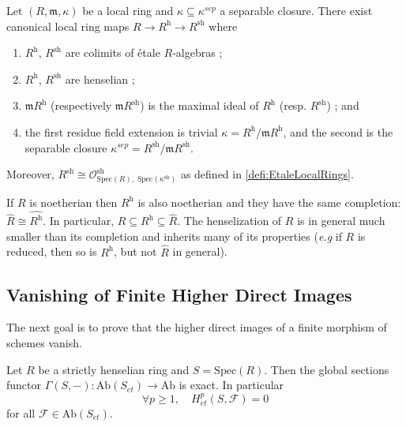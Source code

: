 \begin{theorem}
Let $(R, \mathfrak m, \kappa)$ be a local ring and $\kappa\subseteq\kappa^{sep}$ a separable closure. There exist canonical local ring maps $ R\to R^\text{h} \to R^\text{sh}$ where
\begin{enumerate}
\item $R^\text{h}$, $R^\text{sh}$ are colimits of \'etale $R$-algebras ;
\item $R^\text{h}$, $R^\text{sh}$ are henselian ;
\item $\mathfrak m R^\text{h}$ (respectively $\mathfrak m R^\text{sh}$) is the maximal ideal of $R^\text{h}$ (resp. $R^\text{sh}$) ; and 
\item the first residue field extension is trivial $\kappa=R^\text{h}/\mathfrak m R^\text{h}$, and the second is the separable closure $\kappa^{sep} = R^\text{sh}/\mathfrak m R^\text{sh}$. 
\end{enumerate} 
Moreover, $R^\text{sh}\cong \mathcal{O}^\text{sh}_{\text{Spec}(R), \; \text{Spec}(\kappa^\text{sh})}$ as defined in \ref{defi:EtaleLocalRings}.
\end{theorem}

\begin{remark} 
If $R$ is noetherian then $R^\text{h}$ is also noetherian and they have the same completion: $\hat R\cong \widehat{R^\text{h}}$. In particular, $R\subseteq R^\text{h} \subseteq \hat R$. The henselization of $R$ is in general much smaller than its completion and inherits many of its properties ({\it e.g} if $R$ is reduced, then so is $R^\text{h}$, but not $\hat R$ in general).
\end{remark}

\subsection{Vanishing of Finite Higher Direct Images} 

The next goal is to prove that the higher direct images of a finite morphism of schemes vanish.

\begin{lemma} \label{lem:vanishingOfCohomologyOverHenselianRings}
Let $R$ be a strictly henselian ring and $S=\text{Spec}(R)$. Then the global sections functor $\Gamma(S, -): \text{Ab}(S_{et})\to \text{Ab}$ is exact. In particular
$$
\forall p\geq 1, \quad H_{et}^p(S, \mathcal{F})=0
$$
for all $\mathcal{F}\in \text{Ab}(S_{et})$. 
\end{lemma}

